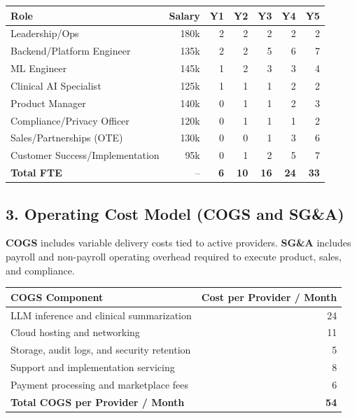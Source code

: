 \documentclass[11pt]{article}
\begin{document}
\begin{center}
\begin{tabular}{lrrrrrr}
\toprule
\textbf{Role} & \textbf{Salary} & \textbf{Y1} & \textbf{Y2} & \textbf{Y3} & \textbf{Y4} & \textbf{Y5} \\
\midrule
Leadership/Ops & 180k & 2 & 2 & 2 & 2 & 2 \\
Backend/Platform Engineer & 135k & 2 & 2 & 5 & 6 & 7 \\
ML Engineer & 145k & 1 & 2 & 3 & 3 & 4 \\
Clinical AI Specialist & 125k & 1 & 1 & 1 & 2 & 2 \\
Product Manager & 140k & 0 & 1 & 1 & 2 & 3 \\
Compliance/Privacy Officer & 120k & 0 & 1 & 1 & 1 & 2 \\
Sales/Partnerships (OTE) & 130k & 0 & 0 & 1 & 3 & 6 \\
Customer Success/Implementation & 95k & 0 & 1 & 2 & 5 & 7 \\
\midrule
\textbf{Total FTE} & -- & \textbf{6} & \textbf{10} & \textbf{16} & \textbf{24} & \textbf{33} \\
\bottomrule
\end{tabular}
\end{center}

\subsection*{3. Operating Cost Model (COGS and SG\&A)}
\textbf{COGS} includes variable delivery costs tied to active providers. \textbf{SG\&A} includes payroll and non-payroll operating overhead required to execute product, sales, and compliance.

\begin{center}
\begin{tabular}{p{} r}
\toprule
\textbf{COGS Component} & \textbf{Cost per Provider / Month} \\
\midrule
LLM inference and clinical summarization & 24 \\
Cloud hosting and networking & 11 \\
Storage, audit logs, and security retention & 5 \\
Support and implementation servicing & 8 \\
Payment processing and marketplace fees & 6 \\
\midrule
\textbf{Total COGS per Provider / Month} & \textbf{54} \\
\bottomrule
\end{tabular}
\end{center}
\end{document}
